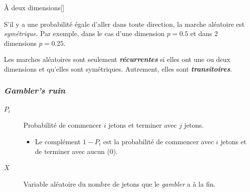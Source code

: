 \documentclass[french]{article}
\begin{document}
\begin{multicols*}{2}
\begin{definitionNOHFILL}
\begin{definitionGENERAL}{À deux dimensions}[]
\begin{center}
\end{center}
\end{definitionGENERAL}
\end{definitionNOHFILL}

\begin{definitionNOHFILLsub}
S'il y a une probabilité égale d'aller dans toute direction, la marche aléatoire est \textit{symétrique}. Par exemple, dans le cas d'une dimension $p = 0.5$ et dans 2 dimensions $p = 0.25$.
\end{definitionNOHFILLsub}

Les marches aléatoires sont seulement \textit{\textbf{récurrentes}} si elles ont une ou deux dimensions et qu'elles sont symétriques. Autrement, elles sont \textit{\textbf{transitoires}}.



\subsubsection{\og \textit{Gambler's ruin} \fg{}}
\begin{distributions}[Notation]
\begin{description}
	\item[$P_{i}$]	Probabilité de commencer $i$ jetons et terminer avec $j$ jetons.
		\begin{itemize}
		\item	Le complément $1 - P_{i}$ est la probabilité de commencer avec $i$ jetons et de terminer avec aucun ($0$).
		\end{itemize}
	\item[$X$]	Variable aléatoire du nombre de jetons que le \og \textit{gambler} \fg{} a à la fin.
\end{description}
\end{distributions}


\end{multicols*}
\end{document}
